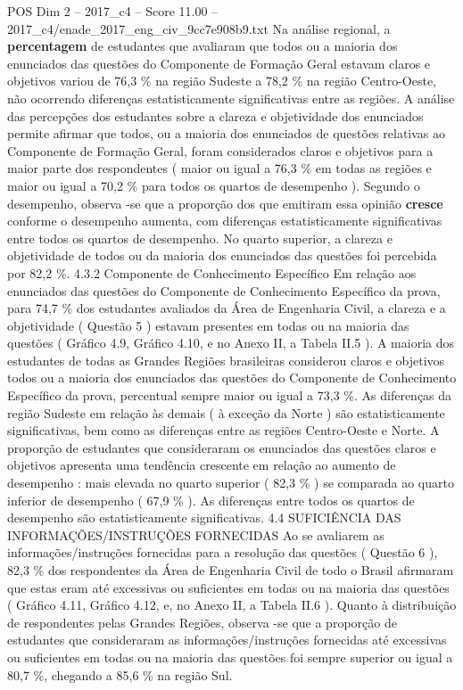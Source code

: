 \begin{textsample}{POS Dim 2 – 2017\_c4 – Score 11.00 – 2017\_c4/enade\_2017\_eng\_civ\_9cc7e908b9.txt}
Na análise regional, a \textbf{percentagem} de estudantes que avaliaram que todos ou a maioria dos enunciados das questões do Componente de Formação Geral estavam claros e objetivos variou de 76,3 \% na região Sudeste a 78,2 \% na região Centro-Oeste, não ocorrendo diferenças estatisticamente significativas entre as regiões.
A análise das percepções dos estudantes sobre a clareza e objetividade dos enunciados permite afirmar que todos, ou a maioria dos enunciados de questões relativas ao Componente de Formação Geral, foram considerados claros e objetivos para a maior parte dos respondentes ( maior ou igual a 76,3 \% em todas as regiões e maior ou igual a 70,2 \% para todos os quartos de desempenho ).
Segundo o desempenho, observa -se que a proporção dos que emitiram essa opinião \textbf{cresce} conforme o desempenho aumenta, com diferenças estatisticamente significativas entre todos os quartos de desempenho.
No quarto superior, a clareza e objetividade de todos ou da maioria dos enunciados das questões foi percebida por 82,2 \%. 4.3.2 Componente de Conhecimento Específico Em relação aos enunciados das questões do Componente de Conhecimento Específico da prova, para 74,7 \% dos estudantes avaliados da Área de Engenharia Civil, a clareza e a objetividade ( Questão 5 ) estavam presentes em todas ou na maioria das questões ( Gráfico 4.9, Gráfico 4.10, e no Anexo II, a Tabela II.5 ).
A maioria dos estudantes de todas as Grandes Regiões brasileiras considerou claros e objetivos todos ou a maioria dos enunciados das questões do Componente de Conhecimento Específico da prova, percentual sempre maior ou igual a 73,3 \%.
As diferenças da região Sudeste em relação às demais ( à exceção da Norte ) são estatisticamente significativas, bem como as diferenças entre as regiões Centro-Oeste e Norte.
A proporção de estudantes que consideraram os enunciados das questões claros e objetivos apresenta uma tendência crescente em relação ao aumento de desempenho : mais elevada no quarto superior ( 82,3 \% ) se comparada ao quarto inferior de desempenho ( 67,9 \% ).
As diferenças entre todos os quartos de desempenho são estatisticamente significativas. 4.4 SUFICIÊNCIA DAS INFORMAÇÕES/INSTRUÇÕES FORNECIDAS Ao se avaliarem as informações/instruções fornecidas para a resolução das questões ( Questão 6 ), 82,3 \% dos respondentes da Área de Engenharia Civil de todo o Brasil afirmaram que estas eram até excessivas ou suficientes em todas ou na maioria das questões ( Gráfico 4.11, Gráfico 4.12, e, no Anexo II, a Tabela II.6 ).
Quanto à distribuição de respondentes pelas Grandes Regiões, observa -se que a proporção de estudantes que consideraram as informações/instruções fornecidas até excessivas ou suficientes em todas ou na maioria das questões foi sempre superior ou igual a 80,7 \%, chegando a 85,6 \% na região Sul.

\end{textsample}
